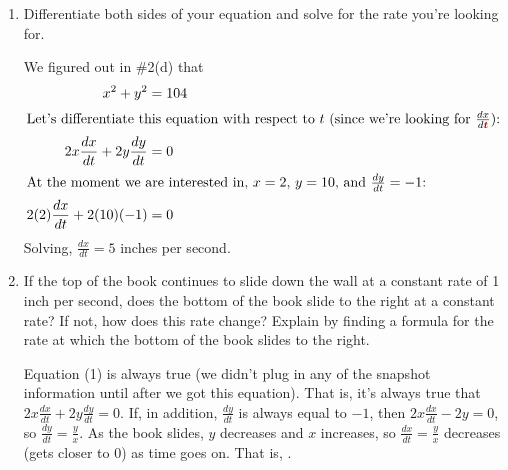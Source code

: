 \documentclass[main]{subfiles}
\begin{document}
\begin{enumerate}
\begin{enumerate}
      \begin{solution}
        By the Pythagorean Theorem, $x^2 + y^2 = 104$. 
      \end{solution}

    \item
      \begin{problem}[\stretch{2}]
        Differentiate both sides of your equation and solve for the rate you're looking for.
      \end{problem}

      \begin{solution}
        We figured out in {{{{\#2}}(d)}} that
        \begin{align}
          x^2 + y^2 &= 104 \nonumber \\
          \intertext{Let's differentiate this equation with respect to $t$
            (since we're looking for $\frac{dx}{d\ideas{\bm{t}}}$):} %
          2x \frac{dx}{dt} + 2y \frac{dy}{dt} &=
          0
 \\
          \intertext{At the moment we are interested in, $x = 2$, $y =
            10$, and $\frac{dy}{dt} = -1$:}
          2 (2) \frac{dx}{dt} + 2 (10)(-1) &= 0 \nonumber 
        \end{align}
        Solving, $\frac{dx}{dt} = 5$ inches per second.
      \end{solution}


    \item
      \begin{problem}[\vfill\newpage]
        If the top of the book continues to slide down the wall at a constant rate of 1 inch per second, does the bottom of the book slide to the right at a constant rate?  If not, how does this rate change?  Explain by finding a formula for the rate at which the bottom of the book slides to the right. 
      \end{problem}

      \begin{solution}
        Equation (1) is always true (we didn't
        plug in any of the snapshot information until after we got this
        equation).  That is, it's always true that $2x \frac{dx}{dt} + 2y
        \frac{dy}{dt} = 0$.  If, in addition, $\frac{dy}{dt}$ is always
        equal to $-1$, then $2x \frac{dx}{dt} - 2y = 0$, so $\frac{dy}{dt}
        = \frac{y}{x}$.  As the book slides, $y$ decreases and $x$
        increases, so $\frac{dx}{dt} = \frac{y}{x}$ decreases (gets closer
        to 0) as time goes on.  That is, .
      \end{solution}

    \end{enumerate}

\end{enumerate}
\end{document}
